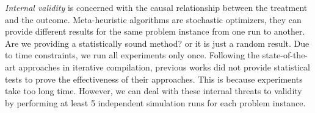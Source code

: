 \textit{Internal validity} is concerned with the causal relationship between the treatment and the outcome. Meta-heuristic algorithms are stochastic optimizers, they can provide different results for the same problem instance from one run to another. Are we providing a statistically sound method? or it is just a random result. Due to time constraints, we run all experiments only once. Following the state-of-the-art approaches in iterative compilation, previous works\cite{hoste2008cole,martinez2014multi} did not provide statistical tests to prove the effectiveness of their approaches. This is because experiments take too long time. However, we can deal with these internal threats to validity by performing at least 5 independent simulation runs for each problem instance. 
 
 

 

